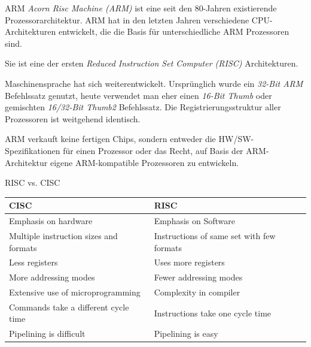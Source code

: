 \begin{defi}{ARM}
    \emph{Acorn Risc Machine (ARM)} ist eine seit den 80-Jahren existierende Prozessorarchitektur.
    ARM hat in den letzten Jahren verschiedene CPU-Architekturen entwickelt, die die Basis für unterschiedliche ARM Prozessoren sind.

    Sie ist eine der ersten \emph{Reduced Instruction Set Computer (RISC)} Architekturen.

    Maschinensprache hat sich weiterentwickelt.
    Ursprünglich wurde ein \emph{32-Bit ARM} Befehlssatz genutzt, heute verwendet man eher einen \emph{16-Bit Thumb} oder gemischten \emph{16/32-Bit Thumb2} Befehlssatz.
    Die Registrierungsstruktur aller Prozessoren ist weitgehend identisch.

    ARM verkauft keine fertigen Chips, sondern entweder die HW/SW-Spezifikationen für einen Prozessor oder das Recht, auf Basis der ARM-Architektur eigene ARM-kompatible Prozessoren zu entwickeln.
\end{defi}

\begin{bonus}{RISC vs. CISC}
    \begin{center}
        \begin{tabular}{|l|l|}
            \hline
            CISC                                   & RISC                                      \\\hline\hline
            Emphasis on hardware                   & Emphasis on Software                      \\\hline
            Multiple instruction sizes and formats & Instructions of same set with few formats \\\hline
            Less registers                         & Uses more registers                       \\\hline
            More addressing modes                  & Fewer addressing modes                    \\\hline
            Extensive use of microprogramming      & Complexity in compiler                    \\\hline
            Commands take a different cycle time   & Instructions take one cycle time          \\\hline
            Pipelining is difficult                & Pipelining is easy                        \\\hline
        \end{tabular}
    \end{center}
\end{bonus}

